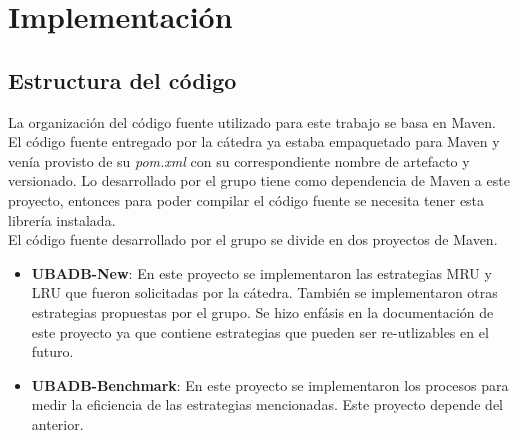 \section{Implementaci\'on}

\subsection{Estructura del c\'odigo}
La organizaci\'on del c\'odigo fuente utilizado para este trabajo se basa en Maven. El
c\'odigo fuente entregado por la c\'atedra ya estaba empaquetado para Maven y ven\'ia
provisto de su \textit{pom.xml} con su correspondiente nombre de artefacto y versionado.
Lo desarrollado por el grupo tiene como dependencia de Maven a este proyecto, entonces 
para poder compilar el c\'odigo fuente se necesita tener esta librer\'ia instalada.\\

El c\'odigo fuente desarrollado por el grupo se divide en dos proyectos de Maven.
\begin{itemize}
\item \textbf{UBADB-New}: En este proyecto se implementaron las estrategias MRU y LRU 
que fueron solicitadas por la c\'atedra. Tambi\'en se implementaron otras estrategias 
propuestas por el grupo. Se hizo enf\'asis en la documentaci\'on de este proyecto ya
que contiene estrategias que pueden ser re-utlizables en el futuro.
\item \textbf{UBADB-Benchmark}: En este proyecto se implementaron los procesos para
medir la eficiencia de las estrategias mencionadas. Este proyecto depende del anterior.
\end{itemize}
  
   

